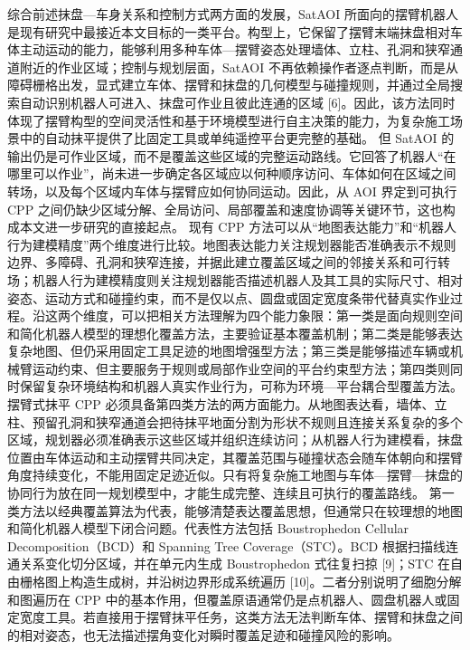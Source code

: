 {}综合前述抹盘—车身关系和控制方式两方面的发展，SatAOI 所面向的摆臂机器人是现有研究中最接近本文目标的一类平台。构型上，它保留了摆臂末端抹盘相对车体主动运动的能力，能够利用多种车体—摆臂姿态处理墙体、立柱、孔洞和狭窄通道附近的作业区域；控制与规划层面，SatAOI 不再依赖操作者逐点判断，而是从障碍栅格出发，显式建立车体、摆臂和抹盘的几何模型与碰撞规则，并通过全局搜索自动识别机器人可进入、抹盘可作业且彼此连通的区域 [6]。因此，该方法同时体现了摆臂构型的空间灵活性和基于环境模型进行自主决策的能力，为复杂施工场景中的自动抹平提供了比固定工具或单纯遥控平台更完整的基础。\markdownRendererParagraphSeparator
{}但 SatAOI 的输出仍是可作业区域，而不是覆盖这些区域的完整运动路线。它回答了机器人“在哪里可以作业”，尚未进一步确定各区域应以何种顺序访问、车体如何在区域之间转场，以及每个区域内车体与摆臂应如何协同运动。因此，从 AOI 界定到可执行 CPP 之间仍缺少区域分解、全局访问、局部覆盖和速度协调等关键环节，这也构成本文进一步研究的直接起点。\markdownRendererParagraphSeparator
{}
\markdownRendererSectionEnd \markdownRendererSectionBegin
{}\markdownRendererInterblockSeparator
{}现有 CPP 方法可以从“地图表达能力”和“机器人行为建模精度”两个维度进行比较。地图表达能力关注规划器能否准确表示不规则边界、多障碍、孔洞和狭窄连接，并据此建立覆盖区域之间的邻接关系和可行转场；机器人行为建模精度则关注规划器能否描述机器人及其工具的实际尺寸、相对姿态、运动方式和碰撞约束，而不是仅以点、圆盘或固定宽度条带代替真实作业过程。沿这两个维度，可以把相关方法理解为四个能力象限：第一类是面向规则空间和简化机器人模型的理想化覆盖方法，主要验证基本覆盖机制；第二类是能够表达复杂地图、但仍采用固定工具足迹的地图增强型方法；第三类是能够描述车辆或机械臂运动约束、但主要服务于规则或局部作业空间的平台约束型方法；第四类则同时保留复杂环境结构和机器人真实作业行为，可称为环境—平台耦合型覆盖方法。\markdownRendererParagraphSeparator
{}摆臂式抹平 CPP 必须具备第四类方法的两方面能力。从地图表达看，墙体、立柱、预留孔洞和狭窄通道会把待抹平地面分割为形状不规则且连接关系复杂的多个区域，规划器必须准确表示这些区域并组织连续访问；从机器人行为建模看，抹盘位置由车体运动和主动摆臂共同决定，其覆盖范围与碰撞状态会随车体朝向和摆臂角度持续变化，不能用固定足迹近似。只有将复杂施工地图与车体—摆臂—抹盘的协同行为放在同一规划模型中，才能生成完整、连续且可执行的覆盖路线。\markdownRendererParagraphSeparator
{}第一类方法以经典覆盖算法为代表，能够清楚表达覆盖思想，但通常只在较理想的地图和简化机器人模型下闭合问题。代表性方法包括 Boustrophedon Cellular Decomposition（BCD）和 Spanning Tree Coverage（STC）。BCD 根据扫描线连通关系变化切分区域，并在单元内生成 Boustrophedon 式往复扫掠 [9]；STC 在自由栅格图上构造生成树，并沿树边界形成系统遍历 [10]。二者分别说明了细胞分解和图遍历在 CPP 中的基本作用，但覆盖原语通常仍是点机器人、圆盘机器人或固定宽度工具。若直接用于摆臂抹平任务，这类方法无法判断车体、摆臂和抹盘之间的相对姿态，也无法描述摆角变化对瞬时覆盖足迹和碰撞风险的影响。\markdownRendererParagraphSeparator
